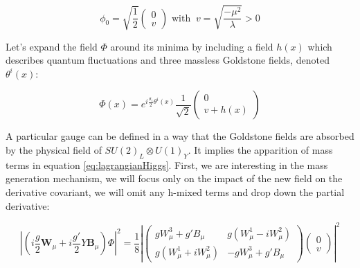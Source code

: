     \begin{equation}
      \phi_0 = \sqrt{\frac{1}{2}}
      \begin{pmatrix}
        0 \\
        v
      \end{pmatrix}
      \text{ with } \ v = \sqrt{\frac{- \mu^2}{\lambda}} > 0
      \label{eq:v}
    \end{equation}

    Let's expand the field $\Phi$ around its minima by including a field $h(x)$ which describes quantum fluctuations and three massless Goldstone fields, denoted $\theta^i(x)$:

    \begin{equation}
      \Phi(x) = e^{i\frac{\sigma_i}{2}\theta^i(x)} \frac{1}{\sqrt{2}}
                \begin{pmatrix}
                   0 \\
                   v + h(x)
                 \end{pmatrix}
      \label{eq:fieldHiggs}
    \end{equation}

     

%
    
    A particular gauge can be defined in a way that the Goldstone fields are absorbed by the physical field of $SU(2)_L \otimes U(1)_Y$.
    It implies the apparition of mass terms in equation \ref{eq:lagrangianHiggs}.
    First, we are interesting in the mass generation mechanism, we will focus only on the impact of the new field on the derivative covariant, we will omit any h-mixed terms and drop down the partial derivative:

    \begin{equation}
      \left|\left(i\frac{g}{2}\textbf{W}_{\mu} +i\frac{g'}{2}Y\textbf{B}_{\mu}\right) \Phi \right|^2 = \frac{1}{8}\left|
              \begin{pmatrix}
                 gW^3_{\mu} +g'B_{\mu} & g(W^1_{\mu} - i W^2_{\mu}) \\
                 g(W^1_{\mu} + i W^2_{\mu}) & - g W^3_{\mu} + g'B_{\mu}
              \end{pmatrix}
              \begin{pmatrix}
                0 \\
                v
              \end{pmatrix}
         \right|^2
      \label{eq:derHiggs}
    \end{equation}

